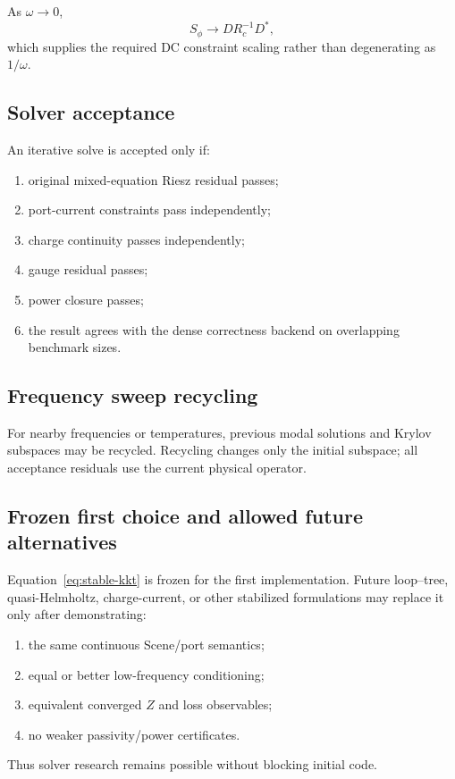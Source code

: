 As $\omega\to0$,
\[
 S_\phi
 \to
 D R_c^{-1}D^\ast,
\]
which supplies the required DC constraint scaling rather than degenerating as
$1/\omega$.

\subsection{Solver acceptance}

An iterative solve is accepted only if:
\begin{enumerate}
\item original mixed-equation Riesz residual passes;
\item port-current constraints pass independently;
\item charge continuity passes independently;
\item gauge residual passes;
\item power closure passes;
\item the result agrees with the dense correctness backend on overlapping
      benchmark sizes.
\end{enumerate}

\subsection{Frequency sweep recycling}

For nearby frequencies or temperatures, previous modal solutions and Krylov
subspaces may be recycled. Recycling changes only the initial subspace; all
acceptance residuals use the current physical operator.

\subsection{Frozen first choice and allowed future alternatives}

Equation~\eqref{eq:stable-kkt} is frozen for the first implementation. Future
loop--tree, quasi-Helmholtz, charge-current, or other stabilized formulations
may replace it only after demonstrating:
\begin{enumerate}
\item the same continuous Scene/port semantics;
\item equal or better low-frequency conditioning;
\item equivalent converged $Z$ and loss observables;
\item no weaker passivity/power certificates.
\end{enumerate}
Thus solver research remains possible without blocking initial code.
